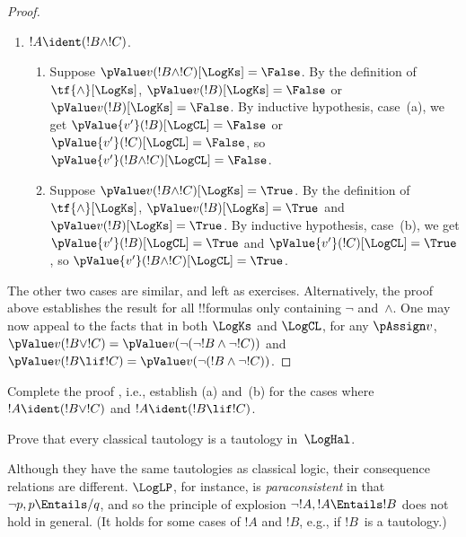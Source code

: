 \documentclass[../../../include/open-logic-section]{subfiles}
\begin{document}
\begin{proof}
\begin{enumerate}
    \item $!A \ident (!B \land !C)$.
    \begin{enumerate}
      \item Suppose $\pValue v(!B \land !C)[\LogKs] = \False$. By the
      definition of $\tf{\land}[\LogKs]$, $\pValue v(!B)[\LogKs]  =
      \False$ or $\pValue v(!B)[\LogKs]  = \False$. By inductive
      hypothesis, case~(a), we get $\pValue {v'}(!B)[\LogCL]  = \False$
      or $\pValue {v'}(!C)[\LogCL]  = \False$, so $\pValue {v'}(!B \land
      !C)[\LogCL] = \False$.
      \item Suppose $\pValue v(!B \land !C)[\LogKs] = \True$. By the
      definition of $\tf{\land}[\LogKs]$, $\pValue v(!B)[\LogKs]  =
      \True$ and $\pValue v(!B)[\LogKs]  = \True$. By inductive
      hypothesis, case~(b), we get $\pValue {v'}(!B)[\LogCL]  = \True$
      and $\pValue {v'}(!C)[\LogCL]  = \True$, so $\pValue {v'}(!B \land
      !C)[\LogCL] = \True$.
    \end{enumerate}
  \end{enumerate}

  The other two cases are similar, and left as exercises. Alternatively,
  the proof above establishes the result for all !!{formula}s only
  containing $\lnot$ and~$\land$. One may now appeal to the facts that in
  both $\LogKs$ and $\LogCL$, for any $\pAssign v$, $\pValue v(!B \lor
  !C) = \pValue v(\lnot(\lnot!B \land \lnot !C))$ and $\pValue v(!B \lif
  !C) = \pValue v(\lnot(!B \land \lnot !C))$.
\end{proof}

\begin{prob}
  Complete the proof , i.e.,
  establish (a) and~(b) for the cases where $!A \ident (!B \lor !C)$
  and $!A \ident (!B \lif !C)$.
\end{prob}

\begin{prob}
Prove that every classical tautology is a tautology in~$\LogHal$.
\end{prob}

Although they have the same tautologies as classical logic, their
consequence relations are different.  $\LogLP$, for instance, is
\emph{paraconsistent} in that $\lnot p, p \Entails/ q$, and so the
principle of explosion $\lnot !A, !A \Entails !B$ does not hold in
general. (It holds for some cases of $!A$ and $!B$, e.g., if $!B$~is a
tautology.)
\end{document}
